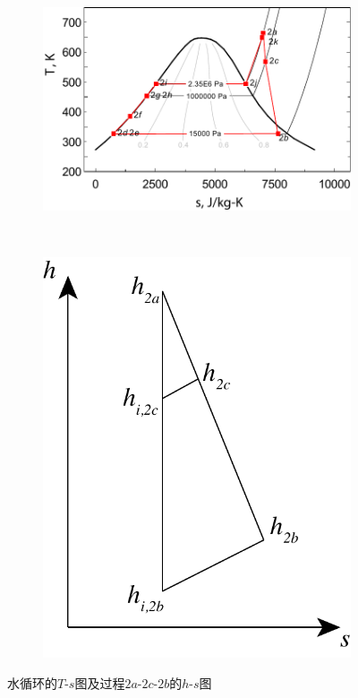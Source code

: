   \begin{figure}[htbp]
\centering
	\begin{subfigure}[b]{0.6\columnwidth}
	\includegraphics[width = \columnwidth]{fig/T-s_Water.pdf}
	\caption{}\label{fig:Ts_Water1}
	\end{subfigure}
	~
\begin{subfigure}[b]{0.28\columnwidth}
	\includegraphics[width = \columnwidth]{fig/SteamTurbine_hs.pdf}
	\caption{}\label{fig:SteamTurbine_hs}
	\end{subfigure}
	\caption{水循环的$T$-$s$图及过程$2a$-$2c$-$2b$的$h$-$s$图}\label{fig:SteamTurbine_hs_p}
\end{figure}

